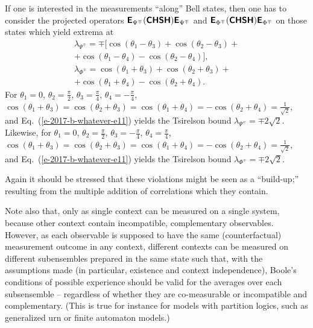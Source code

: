 If one is interested in the measurements ``along'' Bell states, then one has to consider
 the projected operators
$\textsf{\textbf{E}}_{\Psi^\mp} (\textsf{\textbf{CHSH}} ) \textsf{\textbf{E}}_{\Psi^\mp} $ and
$\textsf{\textbf{E}}_{\Phi^\mp} (\textsf{\textbf{CHSH}} )\textsf{\textbf{E}}_{\Phi^\mp} $
on those states which yield extrema at
\begin{equation}
\begin{split}
\lambda_{\Psi^\mp}=
\mp \big[\cos (\theta_1 - \theta_3) +   \cos (\theta_2 - \theta_3) + \\ +\cos (\theta_1 - \theta_4) -  \cos (\theta_2 - \theta_4)\big], \\
\lambda_{\Phi^\mp}=
\cos (\theta_1 + \theta_3) +   \cos (\theta_2 + \theta_3) + \\ +\cos (\theta_1 + \theta_4) -  \cos (\theta_2 + \theta_4)
.
\end{split}
\label{e-2017-b-whatever-e11}
\end{equation}
For
$\theta_1=0$,
$\theta_2= \frac{\pi}{2}$,
$\theta_3=\frac{\pi}{4}$,
$\theta_4 = - \frac{\pi}{4}$,
$\cos (\theta_1 + \theta_3) =   \cos (\theta_2 + \theta_3) = \cos (\theta_1 + \theta_4) = -  \cos (\theta_2 + \theta_4)   =\frac{1}{\sqrt{2}}$,
and Eq.~(\ref{e-2017-b-whatever-e11})
yields the Tsirelson bound
$ \lambda_{\Psi^\mp}=  \mp 2 \sqrt{2}$.
Likewise, for
$\theta_1=0$,
$\theta_2= \frac{\pi}{2}$,
$\theta_3=- \frac{\pi}{4}$,
$\theta_4 = \frac{\pi}{4}$,
$\cos (\theta_1 + \theta_3) =   \cos (\theta_2 + \theta_3) = \cos (\theta_1 + \theta_4) = -  \cos (\theta_2 + \theta_4)   =\frac{1}{\sqrt{2}}$,
and Eq.~(\ref{e-2017-b-whatever-e11})
yields the Tsirelson bound
$\lambda_{\Phi^\mp}=    \mp 2 \sqrt{2}$.

Again it should be stressed that these violations might be seen as a ``build-up;''
resulting from the multiple addition of correlations which they contain.

Note also that, only as single context can be measured on a single system,
because other context contain incompatible, complementary observables.
However, as each observable is supposed to have the same (counterfactual) measurement outcome
in any context,
different contexts can be measured on different subensembles
prepared in the same state such that, with the assumptions made (in particular,
existence and context independence), Boole's conditions of possible
experience should be
valid for the averages over each subsensemble
--
regardless of whether they are co-measurable or incompatible and complementary.
(This is true for instance for models with
partition logics, such as generalized urn or finite automaton models.)

